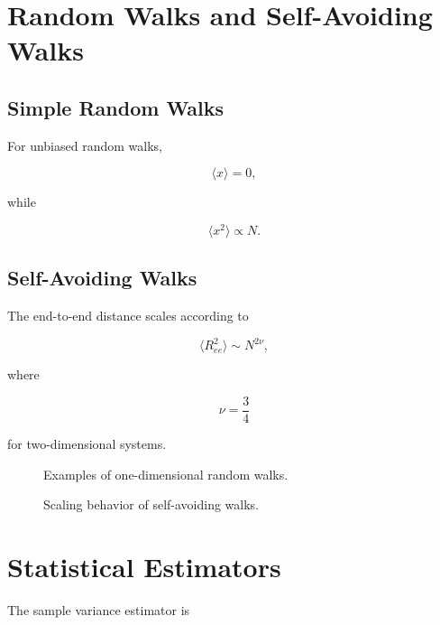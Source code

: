 \documentclass[a4paper]{article}
\begin{document}
\section{Random Walks and Self-Avoiding Walks}

\subsection{Simple Random Walks}

For unbiased random walks,

\begin{equation}
\langle x \rangle = 0,
\end{equation}

while

\begin{equation}
\langle x^2 \rangle \propto N.
\end{equation}

\subsection{Self-Avoiding Walks}

The end-to-end distance scales according to

\begin{equation}
\langle R_{ee}^2 \rangle
\sim
N^{2\nu},
\end{equation}

where

\[
\nu = \frac{3}{4}
\]

for two-dimensional systems.

\begin{figure}[H]
\centering
{}
\caption{Examples of one-dimensional random walks.}
\end{figure}

\begin{figure}[H]
\centering
{}
\caption{Scaling behavior of self-avoiding walks.}
\end{figure}

\section{Statistical Estimators}

The sample variance estimator is
\end{document}
